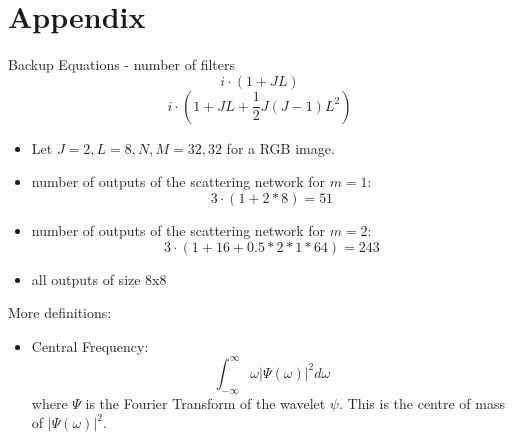 \documentclass[compress]{beamer}
\begin{document}
	\section{Appendix}
	
	\begin{frame}{Backup Equations - number of filters}
		\begin{equation}
		i \cdot (1 + JL) 
		\label{eq:order1_num_filters}
		\end{equation} 
		\begin{equation}
		i \cdot (1 + JL + \frac{1}{2}J(J-1)L^2)
		\label{eq:order2_num_filters}
		\end{equation}
		\begin{itemize}
			\item Let $J=2, L=8, N,M=32,32$ for a RGB image.
			\item number of outputs of the scattering network for $m=1$:
			$$ 3\cdot (1 + 2 * 8) = 51$$
			\item number of outputs of the scattering network for $m=2$:
			$$ 3 \cdot (1 + 16 + 0.5*2*1 * 64) = 243$$
			\item all outputs of size 8x8
		\end{itemize}
	\end{frame}
	\begin{frame}{More definitions:}
		\begin{itemize}
			\item Central Frequency: \begin{equation*}
			\int_{-\infty}^{\infty} \omega | \Psi(\omega)|^2 d\omega
			\end{equation*}
			where $\Psi$ is the Fourier Transform of the wavelet $\psi$. This is the centre of mass of $|\Psi(\omega)|^2$.
		\end{itemize}
	\end{frame}
\end{document}
